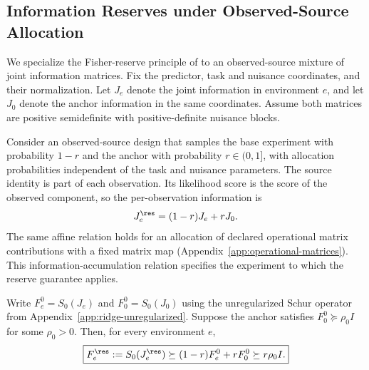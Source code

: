 \subsection{Information Reserves under Observed-Source Allocation}
\label{app:information-reserves}
\label{sec:information-floors}

We specialize the Fisher-reserve principle of \citet{mansouri_arai_2026_fisher_glasses} to an observed-source mixture of joint information matrices. Fix the predictor, task and nuisance coordinates, and their normalization. Let $J_e$ denote the joint information in environment $e$, and let $J_0$ denote the anchor information in the same coordinates. Assume both matrices are positive semidefinite with positive-definite nuisance blocks.

Consider an observed-source design that samples the base experiment with probability $1-r$ and the anchor with probability $r\in(0,1]$, with allocation probabilities independent of the task and nuisance parameters. The source identity is part of each observation. Its likelihood score is the score of the observed component, so the per-observation information is
\begin{equation}
J_e^{\res}=(1-r)J_e+rJ_0.
\label{eq:reserve-information-allocation}
\end{equation}
The same affine relation holds for an allocation of declared operational matrix contributions with a fixed matrix map (Appendix~\ref{app:operational-matrices}). This information-accumulation relation specifies the experiment to which the reserve guarantee applies.

Write $F_e^0=S_0(J_e)$ and $F_0^0=S_0(J_0)$ using the unregularized Schur operator from Appendix~\ref{app:ridge-unregularized}. Suppose the anchor satisfies $F_0^0\succeq\rho_0 I$ for some $\rho_0>0$. Then, for every environment $e$,
\begin{equation}
\boxed{
F_e^{\res}:=S_0(J_e^{\res})
\succeq(1-r)F_e^0+rF_0^0
\succeq r\rho_0 I.
}
\label{eq:reserve-information-floor}
\end{equation}


